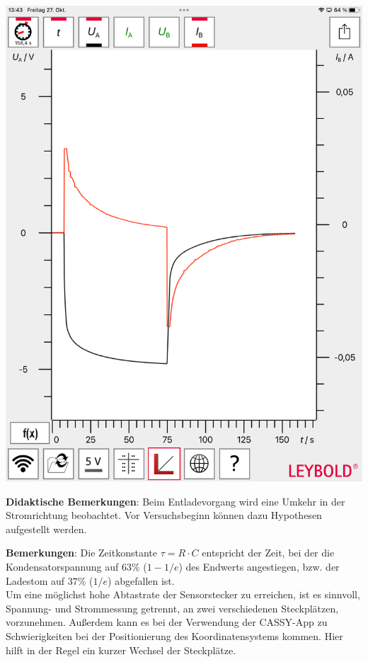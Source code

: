\documentclass[../main.tex]{subfiles}
\begin{document}
\begin{tcolorbox}
\begin{minipage}[]{0.74\textwidth}
    
\end{minipage}
\hspace{0.05cm}    
\begin{minipage}[]{0.24\textwidth}
        \vspace{-0.2cm}
        \begin{center}
            \includegraphics[width=1\textwidth]{img/cassy}
        \end{center}
    \end{minipage}
  
    \vspace{0.5cm}
    \textbf{Didaktische Bemerkungen}: Beim Entladevorgang wird eine Umkehr in der Stromrichtung beobachtet. Vor Versuchsbeginn können dazu Hypothesen aufgestellt werden.      
    
    \vspace{0.5cm}
    \textbf{Bemerkungen}: Die Zeitkonstante $\tau=R \cdot C$ entspricht der Zeit, bei der die Kondensatorspannung auf $63 \%$ ($1-1/e$) des Endwerts angestiegen, bzw. der Ladestom auf $37 \%$ ($1/e$) abgefallen ist. \\
    Um eine möglichst hohe Abtastrate der Sensorstecker zu erreichen, ist es sinnvoll, Spannung- und Strommessung getrennt, an zwei verschiedenen Steckplätzen, vorzunehmen. Außerdem kann es bei der Verwendung der CASSY-App zu Schwierigkeiten bei der Positionierung des Koordinatensystems kommen. Hier hilft in der Regel ein kurzer Wechsel der Steckplätze.
\end{tcolorbox}
\end{document}
